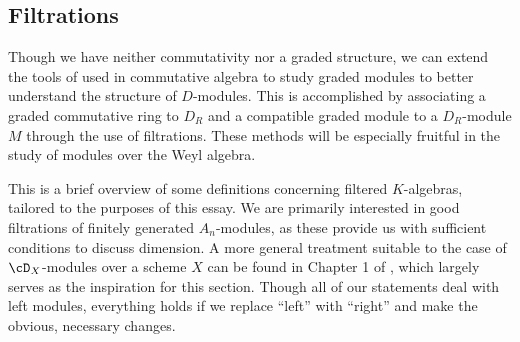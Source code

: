 \subsection{Filtrations}

Though we have neither commutativity nor a graded structure, we can extend the tools of used in commutative algebra to study graded modules to better understand the structure of $D$-modules. This is accomplished by associating a graded commutative ring to $D_{R}$ and a compatible graded module to a $D_{R}$-module $M$ through the use of filtrations. These methods will be especially fruitful in the study of modules over the Weyl algebra.

This is a brief overview of some definitions concerning filtered $K$-algebras, tailored to the purposes of this essay. We are primarily interested in good filtrations of finitely generated $A_n$-modules, as these provide us with sufficient conditions to discuss dimension. A more general treatment suitable to the case of $\cD_X$-modules over a scheme $X$ can be found in Chapter 1 of \cite{ginzburg_d-mod}, which largely serves as the inspiration for this section. Though all of our statements deal with left modules, everything holds if we replace ``left'' with ``right'' and make the obvious, necessary changes.

